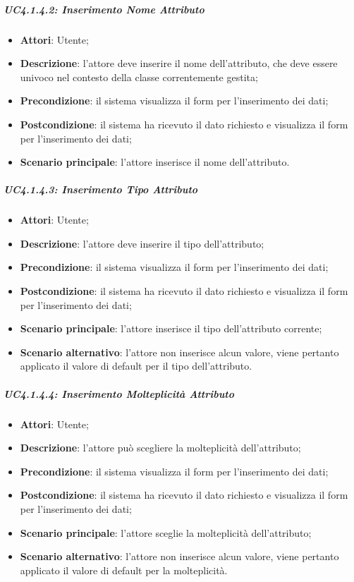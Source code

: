 \begin{itemize}
\begin{itemize}
\begin{itemize}
\begin{itemize}
\subparagraph{UC4.1.4.2: Inserimento Nome Attributo}
\label{UC4.1.4.2}
\begin{itemize}
	\item \textbf{Attori}: Utente;
	\item \textbf{Descrizione}: l'attore deve inserire il nome dell'attributo, che deve essere univoco nel contesto della classe correntemente gestita;
	\item \textbf{Precondizione}: il sistema visualizza il form per l'inserimento dei dati;
	\item \textbf{Postcondizione}: il sistema ha ricevuto il dato richiesto e visualizza il form per l'inserimento dei dati;
	\item \textbf{Scenario principale}: l'attore inserisce il nome dell'attributo.
\end{itemize}

\subparagraph{UC4.1.4.3: Inserimento Tipo Attributo}
\label{UC4.1.4.3}
\begin{itemize}
	\item \textbf{Attori}: Utente;
	\item \textbf{Descrizione}: l'attore deve inserire il tipo dell'attributo;
	\item \textbf{Precondizione}: il sistema visualizza il form per l'inserimento dei dati;
	\item \textbf{Postcondizione}: il sistema ha ricevuto il dato richiesto e visualizza il form per l'inserimento dei dati;
	\item \textbf{Scenario principale}: l'attore inserisce il tipo dell'attributo corrente;
	\item \textbf{Scenario alternativo}: l'attore non inserisce alcun valore, viene pertanto applicato il valore di default per il tipo dell'attributo.
\end{itemize}

\subparagraph{UC4.1.4.4: Inserimento Molteplicità Attributo}
\label{UC4.1.4.4}
\begin{itemize}
	\item \textbf{Attori}: Utente;
	\item \textbf{Descrizione}: l'attore può scegliere la molteplicità dell'attributo;
	\item \textbf{Precondizione}: il sistema visualizza il form per l'inserimento dei dati;
	\item \textbf{Postcondizione}: il sistema ha ricevuto il dato richiesto e visualizza il form per l'inserimento dei dati;
	\item \textbf{Scenario principale}: l'attore sceglie la molteplicità dell'attributo;
	\item \textbf{Scenario alternativo}: l'attore non inserisce alcun valore, viene pertanto applicato il valore di default per la molteplicità.
\end{itemize}


\end{itemize}
\end{itemize}
\end{itemize}
\end{itemize}
